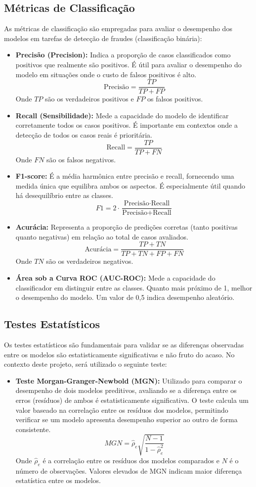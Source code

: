 \subsection{Métricas de Classificação}
As métricas de classificação são empregadas para avaliar o desempenho dos modelos em tarefas de detecção de fraudes (classificação binária):
\begin{itemize}
    \item \textbf{Precisão (Precision):} Indica a proporção de casos classificados como positivos que realmente são positivos. É útil para avaliar o desempenho do modelo em situações onde o custo de falsos positivos é alto.
    \[\text{Precisão} = \frac{TP}{TP + FP}\]
    Onde $TP$ são os verdadeiros positivos e $FP$ os falsos positivos.
    \item \textbf{Recall (Sensibilidade):} Mede a capacidade do modelo de identificar corretamente todos os casos positivos. É importante em contextos onde a detecção de todos os casos reais é prioritária.
    \[\text{Recall} = \frac{TP}{TP + FN}\]
    Onde $FN$ são os falsos negativos.
    \item \textbf{F1-score:} É a média harmônica entre precisão e recall, fornecendo uma medida única que equilibra ambos os aspectos. É especialmente útil quando há desequilíbrio entre as classes.
    \[F1 = 2 \cdot \frac{\text{Precisão} \cdot \text{Recall}}{\text{Precisão} + \text{Recall}}\]
    \item \textbf{Acurácia:} Representa a proporção de predições corretas (tanto positivas quanto negativas) em relação ao total de casos avaliados.
    \[\text{Acurácia} = \frac{TP + TN}{TP + TN + FP + FN}\]
    Onde $TN$ são os verdadeiros negativos.
    \item \textbf{Área sob a Curva ROC (AUC-ROC):} Mede a capacidade do classificador em distinguir entre as classes. Quanto mais próximo de 1, melhor o desempenho do modelo. Um valor de 0,5 indica desempenho aleatório.
\end{itemize}

\subsection{Testes Estatísticos}
Os testes estatísticos são fundamentais para validar se as diferenças observadas entre os modelos são estatisticamente significativas e não fruto do acaso. No contexto deste projeto, será utilizado o seguinte teste:
\begin{itemize}
    \item \textbf{Teste Morgan-Granger-Newbold (MGN):} Utilizado para comparar o desempenho de dois modelos preditivos, avaliando se a diferença entre os erros (resíduos) de ambos é estatisticamente significativa. O teste calcula um valor baseado na correlação entre os resíduos dos modelos, permitindo verificar se um modelo apresenta desempenho superior ao outro de forma consistente.
    \[MGN = \hat{\rho}_e \sqrt{\frac{N-1}{1-\hat{\rho}_e^2}}\]
    Onde $\hat{\rho}_e$ é a correlação entre os resíduos dos modelos comparados e $N$ é o número de observações. Valores elevados de MGN indicam maior diferença estatística entre os modelos.
\end{itemize}

